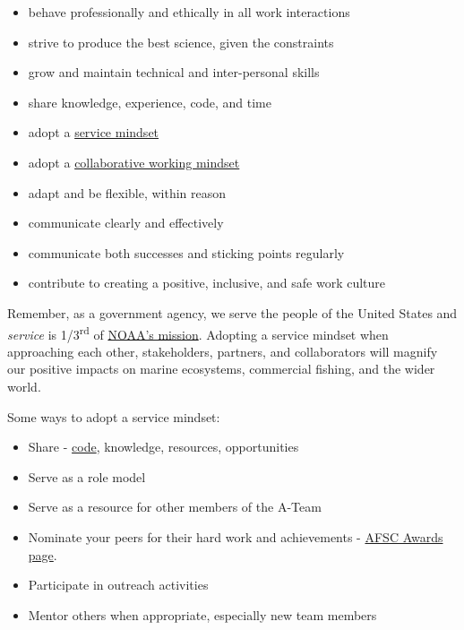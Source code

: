 \documentclass[
  letterpaper,
  DIV=11,
  numbers=noendperiod]{scrreprt}
\providecommand{\tightlist}{%
  \setlength{\itemsep}{0pt}\setlength{\parskip}{0pt}}\usepackage{longtable,booktabs,array}
\begin{document}
\begin{itemize}
\tightlist
\item
  behave professionally and ethically in all work interactions
\item
  strive to produce the best science, given the constraints\\
\item
  grow and maintain technical and inter-personal skills
\item
  share knowledge, experience, code, and time\\
\item
  adopt a \href{https://www.youtube.com/watch?v=q0mzqUMAc20}{service
  mindset}
\item
  adopt a
  \href{https://www.youtube.com/watch?v=AMG8ObDmbaM}{collaborative
  working mindset}\\
\item
  adapt and be flexible, within reason\\
\item
  communicate clearly and effectively
\item
  communicate both successes and sticking points regularly\\
\item
  contribute to creating a positive, inclusive, and safe work culture
\end{itemize}

Remember, as a government agency, we serve the people of the United
States and \emph{service} is 1/3\textsuperscript{rd} of
\href{https://www.noaa.gov/our-mission-and-vision}{NOAA's mission}.
Adopting a service mindset when approaching each other, stakeholders,
partners, and collaborators will magnify our positive impacts on marine
ecosystems, commercial fishing, and the wider world.

Some ways to adopt a service mindset:

\begin{itemize}
\tightlist
\item
  Share - \href{collaborate.qmd}{code}, knowledge, resources,
  opportunities
\item
  Serve as a role model\\
\item
  Serve as a resource for other members of the A-Team\\
\item
  Nominate your peers for their hard work and achievements -
  \href{https://sites.google.com/noaa.gov/myafsc/administrative/workforce-management/awards}{AFSC
  Awards page}.
\item
  Participate in outreach activities
\item
  Mentor others when appropriate, especially new team members
\end{itemize}
\end{document}
